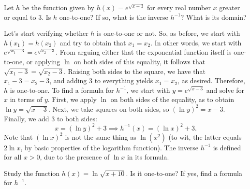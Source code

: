 \documentclass[nooutcomes]{ximera}
\begin{document}
\begin{example}
  Let $h$ be the function given by $h(x) = e^{\sqrt{x-3}}$ for every real number $x$ greater or equal to $3$. Is $h$ one-to-one? If so, what is the inverse $h^{-1}$? What is its domain?

  \begin{explanation}
    Let's start verifying whether $h$ is one-to-one or not. So, as before, we start with $h(x_1)=h(x_2)$ and try to obtain that $x_1=x_2$. In other words, we start with $e^{\sqrt{x_1-3}} = e^{\sqrt{x_2-3}}$. From arguing either that the exponential function itself is one-to-one, or applying $\ln$ on both sides of this equality, it follows that $\sqrt{x_1-3}=\sqrt{x_2-3}$. Raising both sides to the square, we have that $x_1-3=x_2-3$, and adding $3$ to everything yields $x_1=x_2$, as desired. Therefore, $h$ is one-to-one. To find a formula for $h^{-1}$, we start with $y= e^{\sqrt{x-3}}$ and solve for $x$ in terms of $y$. First, we apply $\ln$ on both sides of the equality, as to obtain $\ln y = \sqrt{x-3}$. Next, we take squares on both sides, so $(\ln y)^2 = x-3$. Finally, we add $3$ to both sides: $$x = (\ln y)^2+3 \implies h^{-1}(x) = (\ln x)^2+3.$$Note that $(\ln x)^2$ is not the same thing as $\ln(x^2)$ (to wit, the latter equals $2\ln x$, by basic properties of the logarithm function). The inverse $h^{-1}$ is defined for all $x>0$, due to the presence of $\ln x$ in its formula.
  \end{explanation}
\end{example}

\begin{exploration}
  Study the function $h(x) = \ln \sqrt{x+10}$. Is it one-to-one? If yes, find a formula for $h^{-1}$.
\end{exploration}
\end{document}
